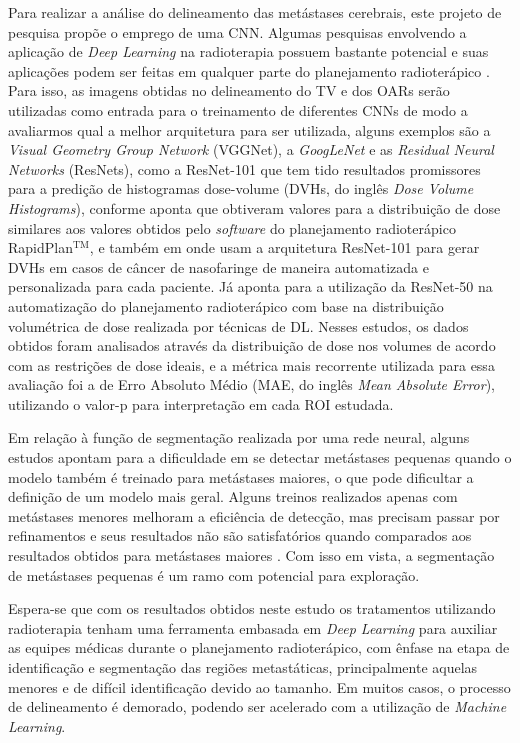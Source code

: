 Para realizar a análise do delineamento das metástases cerebrais, este projeto de pesquisa propõe o emprego de uma CNN. Algumas pesquisas envolvendo a aplicação de \textit{Deep Learning} na radioterapia possuem bastante potencial e suas aplicações podem ser feitas em qualquer parte do planejamento radioterápico \cite{Siddique:2020}. Para isso, as imagens obtidas no delineamento do TV e dos OARs serão utilizadas como entrada para o treinamento de diferentes CNNs de modo a avaliarmos qual a melhor arquitetura para ser utilizada, alguns exemplos são a \textit{Visual Geometry Group Network} (VGGNet), a \textit{GoogLeNet} e as \textit{Residual Neural Networks} (ResNets), como a ResNet-101 que tem tido resultados promissores para a predição de histogramas dose-volume (DVHs, do inglês \textit{Dose Volume Histograms}), conforme aponta \cite{Chen:2021} que obtiveram valores para a distribuição de dose similares aos valores obtidos pelo \textit{software} do planejamento radioterápico RapidPlan$^{\text{TM}}$, e também em \cite{Chen:2018} onde usam a arquitetura ResNet-101 para gerar DVHs em casos de câncer de nasofaringe de maneira automatizada e personalizada para cada paciente. Já \cite{Fan:2018} aponta para a utilização da ResNet-50 na automatização do planejamento radioterápico com base na distribuição volumétrica de dose realizada por técnicas de DL. Nesses estudos, os dados obtidos foram analisados através da distribuição de dose nos volumes de acordo com as restrições de dose ideais, e a métrica mais recorrente utilizada para essa avaliação foi a de Erro Absoluto Médio (MAE, do inglês \textit{Mean Absolute Error}), utilizando o valor-p para interpretação em cada ROI estudada.

Em relação à função de segmentação realizada por uma rede neural, alguns estudos apontam para a dificuldade em se detectar metástases pequenas \cite{Grovik:2020,Bibault:2021,Charron:2018} quando o modelo também é treinado para metástases maiores, o que pode dificultar a definição de um modelo mais geral. Alguns treinos realizados apenas com metástases menores melhoram a eficiência de detecção, mas precisam passar por refinamentos e seus resultados não são satisfatórios quando comparados aos resultados obtidos para metástases maiores \cite{Bousabarah:2020,Zhou:2020}. Com isso em vista, a segmentação de metástases pequenas é um ramo com potencial para exploração.

Espera-se que com os resultados obtidos neste estudo os tratamentos utilizando radioterapia tenham uma ferramenta embasada em \textit{Deep Learning} para auxiliar as equipes médicas durante o planejamento radioterápico, com ênfase na etapa de identificação e segmentação das regiões metastáticas, principalmente aquelas menores e de difícil identificação devido ao tamanho. Em muitos casos, o processo de delineamento é demorado, podendo ser acelerado com a utilização de \textit{Machine Learning}.

